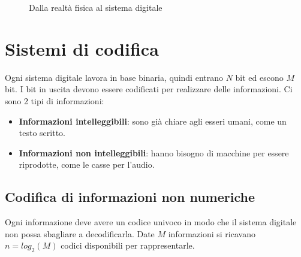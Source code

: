 \documentclass[a4paper]{article}
\theoremstyle{break}
\theoremstyle{break}
\theoremstyle{break}
\theoremstyle{break}
\theoremstyle{break}
\begin{document}
\begin{figure}[h]
	\centering
	\caption{Dalla realtà fisica al sistema digitale}
\end{figure}


\section{Sistemi di codifica}
Ogni sistema digitale lavora in base binaria, quindi entrano \( N \)  bit
ed escono \( M \)  bit. I bit in uscita devono essere codificati per
realizzare delle informazioni. Ci sono 2 tipi di informazioni:

\begin{itemize}
	\item \textbf{Informazioni intelleggibili}: sono già chiare agli esseri umani,
	      come un testo scritto.
	\item \textbf{Informazioni non intelleggibili}: hanno bisogno di macchine
	      per essere riprodotte, come le casse per l'audio.
\end{itemize}

\subsection{Codifica di informazioni non numeriche}
Ogni informazione deve avere un codice univoco in modo che il sistema
digitale non possa sbagliare a decodificarla. Date \( M \)  informazioni si
ricavano \( n = log_2{(M)} \)  codici disponibili per rappresentarle.
\end{document}
